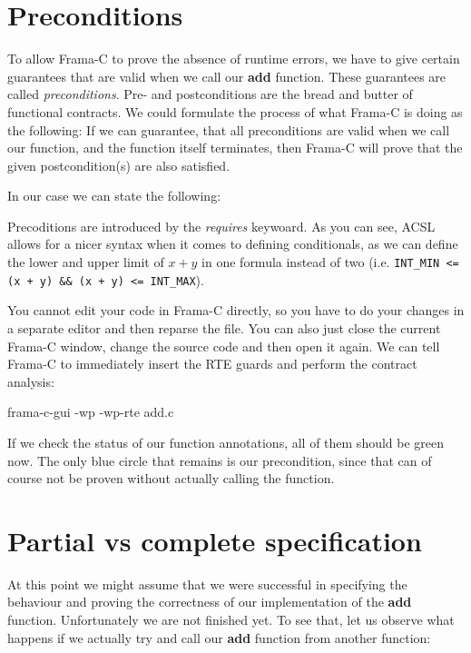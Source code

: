 \section{Preconditions}

To allow Frama-C to prove the absence of runtime errors, we have to give certain guarantees that are valid when we call our \textbf{add} function. These guarantees are called \emph{preconditions}. Pre- and postconditions are the bread and butter of functional contracts. We could formulate the process of what Frama-C is doing as the following: If we can guarantee, that all preconditions are valid when we call our function, and the function itself terminates, then Frama-C will prove that the given postcondition(s) are also satisfied. 

In our case we can state the following:


Precoditions are introduced by the \emph{requires} keywoard. As you can see, ACSL allows for a nicer syntax when it comes to defining conditionals, as we can define the lower and upper limit of $x+y$ in one formula instead of two (i.e. \texttt{INT_MIN <= (x + y) && (x + y) <= INT_MAX}). 

You cannot edit your code in Frama-C directly, so you have to do your changes in a separate editor and then reparse the file. You can also just close the current Frama-C window, change the source code and then open it again. We can tell Frama-C to immediately insert the RTE guards and perform the contract analysis:

\begin{ubuntu}
frama-c-gui -wp -wp-rte add.c
\end{ubuntu}

If we check the status of our function annotations, all of them should be green now. The only blue circle that remains is our precondition, since that can of course not be proven without actually calling the function. 

\section{Partial vs complete specification}

At this point we might assume that we were successful in specifying the behaviour and proving the correctness of our implementation of the \textbf{add} function. Unfortunately we are not finished yet. To see that, let us observe what happens if we actually try and call our \textbf{add} function from another function:

